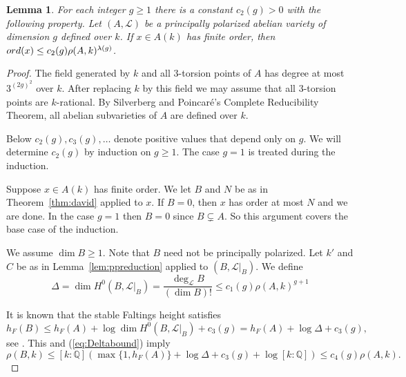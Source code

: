 \documentclass[12pt,oneside]{amsart}
\newcounter{maincounter}
\numberwithin{maincounter}{section}
\numberwithin{equation}{section}
\newtheorem{lemma}[maincounter]{Lemma}
\def\QQ{\mathbb{Q}}
\newcommand{\IQ}{{\QQ}}
\newcommand{\cL}{{\mathcal L}}
\newcommand{\ord}[1]{{\rm ord}({#1})}
\begin{document}
\begin{lemma}\label{lem:DavidBound}
  For each integer $g\ge 1$  there is a constant $c_2(g)>0$
  with the following property.   
  Let
  $(A,\cL)$ be
  a {principally polarized} abelian variety of dimension $g$
  defined over $k$. %
  If $x\in A(k)$ has finite order, then
   $\ord{x}\le c_2(g) \rho(A,k)^{\lambda(g)}$.
\end{lemma}
\begin{proof}
  The field generated by $k$ and all $3$-torsion points of $A$ has
  degree at most $3^{(2g)^2}$ over $k$. After replacing $k$  by this
  field  we may assume that all $3$-torsion points are
  $k$-rational. By Silverberg \cite[Theorem~2.4]{Silverberg:fielddef}
  and Poincar\'e's Complete Reducibility Theorem,  all abelian subvarieties of $A$ are
  defined over $k$. %

  Below $c_2(g),c_3(g),\ldots$ denote positive values that depend only
  on $g$. We will determine $c_2(g)$ by induction on $g\ge 1$.
  The case $g=1$ is treated during the induction.

  Suppose $x\in A(k)$ has finite order. 
  We let $B$ and $N$ be as in  Theorem~\ref{thm:david} applied to $x$.
  If $B=0$, then $x$ has order at most $N$
  and we are done.
  In the case $g=1$ then $B=0$ since $B\subsetneq A$. So this argument
  covers the base case of the induction.

  We assume $\dim B\ge 1$.
  Note that $B$ need not be principally polarized. Let $k'$ and $C$ be
  as in Lemma~\ref{lem:ppreduction} applied to $(B,\cL|_B)$. We define
  \begin{equation}
    \label{eq:Deltabound}
     \Delta = \dim H^0(B,\cL|_B) = \frac{\deg_\cL B}{(\dim B)!}\le c_1(g) \rho(A,k)^{g+1} 
  \end{equation}

  It is known that
  the stable Faltings height satisfies
  \begin{equation*}
    h_F(B) \le h_F(A) + \log \dim H^0(B,\cL|_B) + c_3(g) = h_F(A) +
    \log\Delta + c_3(g),
  \end{equation*}
  see \cite[$\mathsection$2.3]{GR:periodsisgoenies}. This and (\ref{eq:Deltabound}) imply
  \begin{equation*}
    \rho(B,k) \le [k:\IQ] ( \max\{1,h_F(A)\} + \log \Delta +c_3(g) +
    \log[k:\IQ])
    \le c_4(g) \rho(A,k). 
  \end{equation*}


\end{proof}
\end{document}
